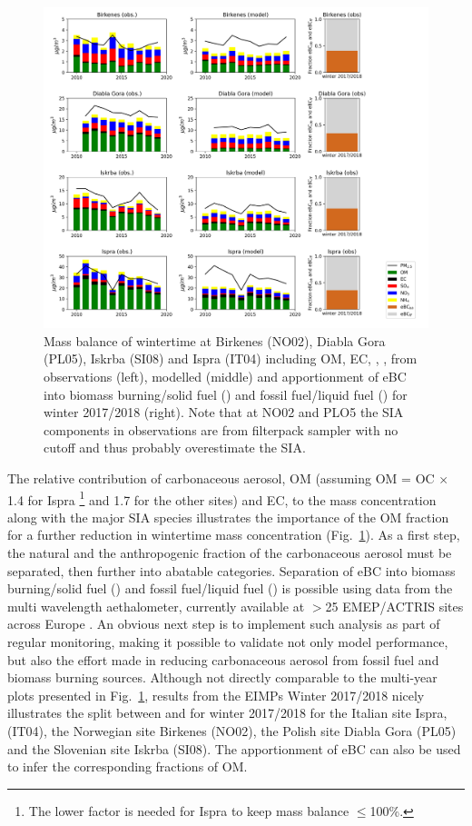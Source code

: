 \begin{figure}
\includegraphics[width=16cm]{FIGS_TRENDS/Compostion_4sites_winter.png}
 \caption{
  Mass balance of wintertime \pmfine at  Birkenes (NO02), Diabla Gora
  (PL05), Iskrba (SI08) and Ispra (IT04) including OM, EC, , ,  from 
  observations (left), modelled (middle) and apportionment of eBC
  into biomass burning/solid fuel (\EBCbb) and fossil fuel/liquid fuel
  (\EBCff) for winter 2017/2018 (right). Note that at NO02 and PLO5 the SIA components in observations are from filterpack sampler with no cutoff and thus probably overestimate the \pmfine SIA. \label{fig:KEX4}
 }
\end{figure}


The relative contribution of carbonaceous aerosol, OM (assuming OM = OC $\times$
1.4 for Ispra
\footnote{The lower factor is needed for Ispra to keep mass balance $\le$100\%.}
and 1.7 for the other sites)
 and EC, to the \pmfine mass concentration along with the major
SIA species illustrates the importance of the OM fraction for a further
reduction in wintertime \pmfine mass concentration (Fig.~\ref{fig:KEX4}). As a first step,
the natural and the anthropogenic fraction of the carbonaceous aerosol
must be separated, then further into abatable categories. Separation of
eBC \citep[equivalent BC, ][]{Petzold2013} into biomass burning/solid fuel (\EBCbb) and fossil fuel/liquid fuel
(\EBCff) is possible using data from the multi wavelength aethalometer,
currently available at $>$25 EMEP/ACTRIS sites across Europe \citep{Yttri:2014,Platt:2020a,Platt:2020b,Platt20XX}. An obvious next
step is to implement such analysis as part of regular monitoring,
making it possible to validate not only model performance, but also the
effort made in reducing carbonaceous aerosol from fossil fuel and biomass
burning sources. Although not directly comparable to the multi-year plots
presented in Fig.~\ref{fig:KEX4}, results from the EIMPs Winter 2017/2018 nicely
illustrates the split between \EBCbb and \EBCff for winter 2017/2018 for
the Italian site Ispra, (IT04), the Norwegian site Birkenes (NO02), the
Polish site Diabla Gora (PL05) and the Slovenian site Iskrba (SI08). The
apportionment of eBC can also be used to infer the corresponding fractions
of OM.


